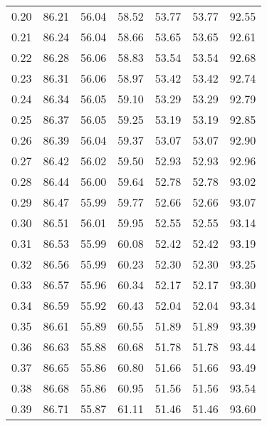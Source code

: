 \begin{tabular}{|c|c|c|c|c|c|c|}
      0.20 &     86.21 &     56.04 &      58.52 &   53.77 &      53.77 &         92.55 \\
      0.21 &     86.24 &     56.04 &      58.66 &   53.65 &      53.65 &         92.61 \\
      0.22 &     86.28 &     56.06 &      58.83 &   53.54 &      53.54 &         92.68 \\
      0.23 &     86.31 &     56.06 &      58.97 &   53.42 &      53.42 &         92.74 \\
      0.24 &     86.34 &     56.05 &      59.10 &   53.29 &      53.29 &         92.79 \\
      0.25 &     86.37 &     56.05 &      59.25 &   53.19 &      53.19 &         92.85 \\
      0.26 &     86.39 &     56.04 &      59.37 &   53.07 &      53.07 &         92.90 \\
      0.27 &     86.42 &     56.02 &      59.50 &   52.93 &      52.93 &         92.96 \\
      0.28 &     86.44 &     56.00 &      59.64 &   52.78 &      52.78 &         93.02 \\
      0.29 &     86.47 &     55.99 &      59.77 &   52.66 &      52.66 &         93.07 \\
      0.30 &     86.51 &     56.01 &      59.95 &   52.55 &      52.55 &         93.14 \\
      0.31 &     86.53 &     55.99 &      60.08 &   52.42 &      52.42 &         93.19 \\
      0.32 &     86.56 &     55.99 &      60.23 &   52.30 &      52.30 &         93.25 \\
      0.33 &     86.57 &     55.96 &      60.34 &   52.17 &      52.17 &         93.30 \\
      0.34 &     86.59 &     55.92 &      60.43 &   52.04 &      52.04 &         93.34 \\
      0.35 &     86.61 &     55.89 &      60.55 &   51.89 &      51.89 &         93.39 \\
      0.36 &     86.63 &     55.88 &      60.68 &   51.78 &      51.78 &         93.44 \\
      0.37 &     86.65 &     55.86 &      60.80 &   51.66 &      51.66 &         93.49 \\
      0.38 &     86.68 &     55.86 &      60.95 &   51.56 &      51.56 &         93.54 \\
      0.39 &     86.71 &     55.87 &      61.11 &   51.46 &      51.46 &         93.60 \\

\end{tabular}

